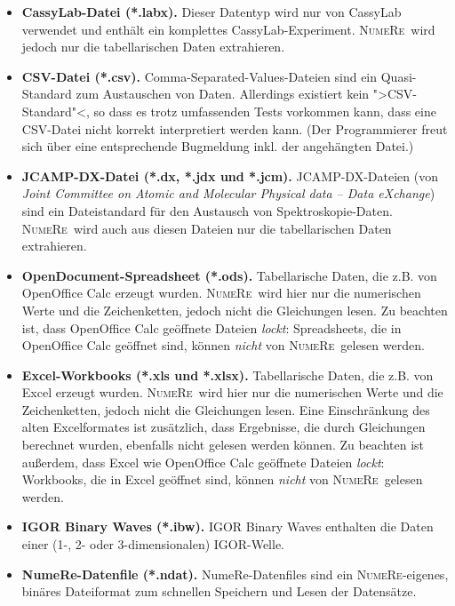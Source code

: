 \documentclass[DIV=14,headsepline,footsepline]{scrbook}
\newcommand{\NR}{\textsc{Nu\-me\-Re}}
\begin{document}
				\begin{itemize}
					\item \textbf{CassyLab-Datei (*.labx).} Dieser Datentyp wird nur von CassyLab verwendet und enthält ein komplettes CassyLab-Experiment. \NR\ wird jedoch nur die tabellarischen Daten extrahieren.
					\item \textbf{CSV-Datei (*.csv).} Comma-Separated-Values-Dateien sind ein Quasi-Standard zum Austauschen von Daten. Allerdings existiert kein ">CSV-Standard"<, so dass es trotz umfassenden Tests vorkommen kann, dass eine CSV-Datei nicht korrekt interpretiert werden kann. (Der Programmierer freut sich über eine entsprechende Bugmeldung inkl. der angehängten Datei.)
					\item \textbf{JCAMP-DX-Datei (*.dx, *.jdx und *.jcm).} JCAMP-DX-Dateien (von \emph{Joint Committee on Atomic and Molecular Physical data -- Data eXchange}) sind ein Dateistandard für den Austausch von Spek\-tro\-sko\-pie-Daten. \NR\ wird auch aus diesen Dateien nur die tabellarischen Daten extrahieren.
					\item \textbf{OpenDocument-Spreadsheet (*.ods).} Tabellarische Daten, die z.B. von OpenOffice Calc erzeugt wurden. \NR\ wird hier nur die numerischen Werte und die Zeichenketten, jedoch nicht die Gleichungen lesen. Zu beachten ist, dass OpenOffice Calc geöffnete Dateien \emph{lockt}: Spreadsheets, die in OpenOffice Calc geöffnet sind, können \emph{nicht} von \NR\ gelesen werden.
					\item \textbf{Excel-Workbooks (*.xls und *.xlsx).} Tabellarische Daten, die z.B. von Excel erzeugt wurden. \NR\ wird hier nur die numerischen Werte und die Zeichenketten, jedoch nicht die Gleichungen lesen. Eine Einschränkung des alten Excelformates ist zusätzlich, dass Ergebnisse, die durch Gleichungen berechnet wurden, ebenfalls nicht gelesen werden können. Zu beachten ist außerdem, dass Excel wie OpenOffice Calc geöffnete Dateien \emph{lockt}: Workbooks, die in Excel geöffnet sind, können \emph{nicht} von \NR\ gelesen werden.
					\item \textbf{IGOR Binary Waves (*.ibw).} IGOR Binary Waves enthalten die Daten einer (1-, 2- oder 3-dimensionalen) IGOR-Welle.
					\item \textbf{NumeRe-Datenfile (*.ndat).} NumeRe-Datenfiles sind ein \NR-eigenes, binäres Dateiformat zum schnellen Speichern und Lesen der Datensätze.
				\end{itemize}
				
\end{document}
